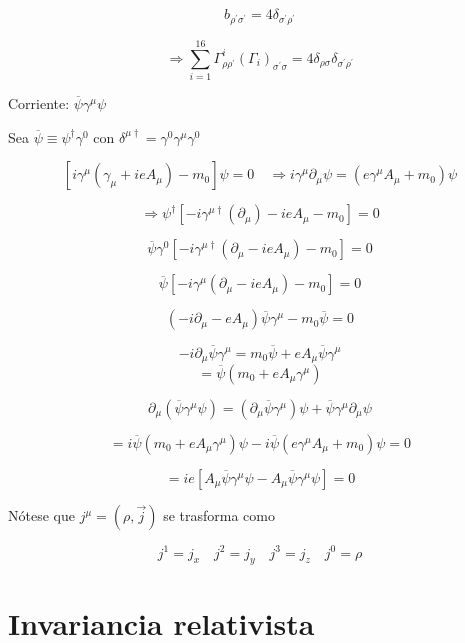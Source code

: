 \documentclass{report}
\begin{document}
\[b _{\rho^{\prime} \sigma^{\prime}} = 4 \delta _{\sigma^{\prime} \rho^{\prime}}\]

\[\Rightarrow \sum_{i = 1}^{16} \Gamma_{\rho \rho^{\prime}}^{i} (\Gamma_{i})_{\sigma^{\prime} \sigma} = 4 \delta_{\rho \sigma} \delta_{\sigma^{\prime} \rho^{\prime}}\]

Corriente: $\overline{\psi} \gamma^{\mu} \psi$

Sea $\overline{\psi} \equiv \psi ^{\dagger} \gamma^0$ con $\delta^{\mu \dagger } = \gamma^0 \gamma^{\mu} \gamma^{0}$

\[[i \gamma^{\mu} (\gamma_{\mu} + i e A_{\mu}) - m_{0}] \psi = 0 \quad \Rightarrow i \gamma^{\mu} \partial_{\mu} \psi = (e \gamma^{\mu} A_{\mu} + m_0) \psi\]

\[ \Rightarrow \psi^{\dagger} [-i \gamma^{\mu \dagger}(\partial_{\mu}) - i e A_{\mu} - m_0] =0 \]

\[\overline{\psi} \gamma^0 [-i \gamma^{\mu \dagger} (\partial_{\mu} - ieA_{\mu})-m_0 ]= 0\]

\[\overline{\psi} [-i \gamma^{\mu} (\partial_{\mu} - ieA_{\mu})-m_0 ]= 0\]

\[(-i \partial_{\mu} - e A_{\mu})\overline{\psi} \gamma^{\mu} - m_{0} \overline{\psi} = 0\]

\[-i \partial_{\mu} \overline{\psi} \gamma^{\mu} = m_0 \overline{\psi} + e A_{\mu} \overline{\psi} \gamma^{\mu}\]
\begin{equation}
= \overline{\psi}(m_0 + e A_{\mu} \gamma^{\mu})
\end{equation}

\[\partial_{\mu} (\overline{\psi} \gamma^{\mu} \psi) = (\partial_{\mu} \overline{\psi} \gamma^{\mu}) \psi + \overline{\psi} \gamma^{\mu} \partial_{\mu} \psi\]

\[= i \overline{\psi} (m_0 + e A_{\mu} \gamma^{\mu}) \psi - i \overline{\psi} (e \gamma^{\mu} A_{\mu} + m_0) \psi = 0\]

\[= i e [A_{\mu} \overline{\psi} \gamma^{\mu} \psi - A_{\mu} \overline{\psi} \gamma^{\mu} \psi ] = 0\]

Nótese que $j^{\mu} = (\rho, \overrightarrow{j})$ se trasforma como

\[j^{1} = j _{x} \quad j^{2} = j _{y} \quad j^{3} = j _{z} \quad j^{0} = \rho \]


\chapter{Invariancia relativista}
\end{document}
